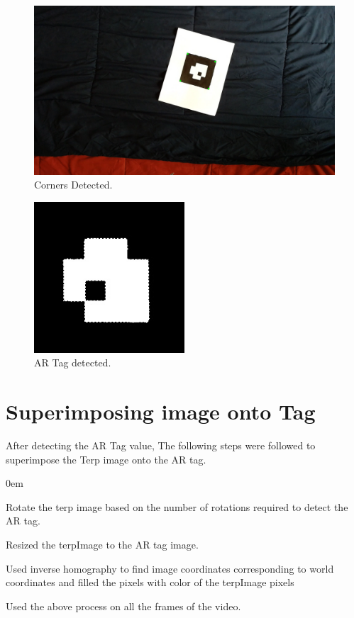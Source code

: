 \documentclass[11pt]{article}
\begin{document}
\begin{figure}[!htbp]
  \centering
	\includegraphics[width=1\textwidth]{cornersARTag}
	\caption{Corners Detected.}
\end{figure}

\begin{figure}[!htbp]
  \centering
	\includegraphics[width=0.5\textwidth]{AR_Code_Homography}
	\caption{AR Tag detected.}
\end{figure}

\section{Superimposing image onto Tag}
After detecting the AR Tag value, The following steps were followed to superimpose the Terp image onto the AR tag.
\begin{description}
\addtolength{\itemindent}{0.80cm}
\itemsep0em 
\item[1.] Rotate the terp image based on the number of rotations required to detect the AR tag.
\item[2.] Resized the terpImage to the AR tag image.
\item[3.] Used inverse homography to find image coordinates corresponding to world coordinates and filled the pixels with color of the terpImage pixels
\item[4.] Used the above process on all the frames of the video.
\end{description}
\end{document}
